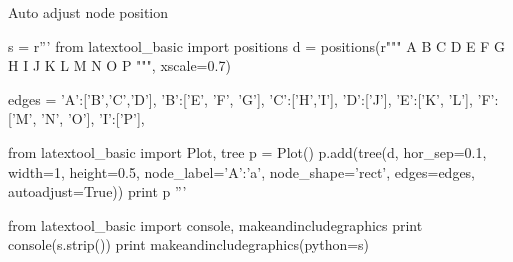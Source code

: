 \newpage
Auto adjust node position

\begin{python}
s = r'''
from latextool_basic import positions
d = positions(r"""
      A   
  B   C   D
E F G H   I J  
K L M N O P
""", xscale=0.7)

edges = {'A':['B','C','D'], 'B':['E', 'F', 'G'],
         'C':['H','I'],     'D':['J'],
         'E':['K', 'L'],    'F':['M', 'N', 'O'],
         'I':['P'],
}

from latextool_basic import Plot, tree
p = Plot()
p.add(tree(d,
           hor_sep=0.1,
           width=1, height=0.5, 
           node_label={'A':'a'},
           node_shape='rect',
           edges=edges,
           autoadjust=True))
print p
'''

from latextool_basic import console, makeandincludegraphics
print console(s.strip())
print makeandincludegraphics(python=s)
\end{python}
